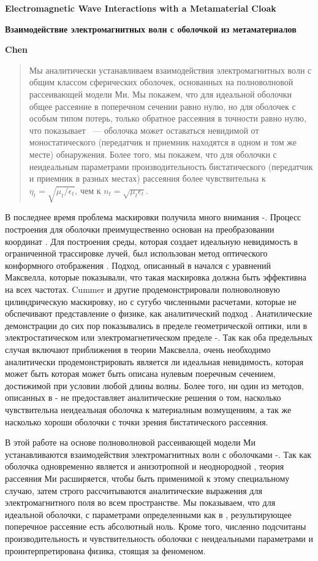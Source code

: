 \documentclass[a4paper, 12pt]{article}
\newcommand{\tit}[1]{\begin{center}{\bf{\Large #1}}\end{center}}
\newcommand{\aut}[1]{\centerline{{\bf #1}}}
\begin{document}
\sloppy
\tit{Electromagnetic Wave Interactions with a Metamaterial Cloak}
\tit{Взаимодействие электромагнитных волн с оболочкой из метаматериалов}
\aut{Chen}

\begin{abstract}
Мы аналитически устанавливаем взаимодействия электромагнитных волн с общим
классом сферических оболочек, основанных на полноволновой рассеивающей модели Ми.
Мы покажем, что для идеальной оболочки общее рассеяние в поперечном сечении равно
нулю, но для оболочек с особым типом потерь, только обратное рассеяния в точности 
равно нулю, что показывает ~--- оболочка может оставаться невидимой от 
моностатического (передатчик и приемник находятся в одном и том же месте) 
обнаружения. Более того, мы покажем, что для оболочки с неидеальным параметрами
производительность бистатического (передатчик и приемник в разных местах) рассеяния
более чувствительна к $\eta_t=\sqrt{\mu_t/\epsilon_t}$, чем
к $n_t=\sqrt{\mu_t\epsilon_t}$.
\end{abstract}


В последнее время проблема маскировки получила много внимания \cite{1}-\cite{11}.
Процесс построения для оболочки преимущественно основан на преобразовании координат
\cite{4}. Для построения среды, которая создает идеальную невидимость в ограниченной
трассировке лучей, был использован метод оптического конформного отображения 
\cite{6}. Подход, описанный в \cite{4} начался с уравнений Максвелла, которые показывали, что такая маскировка должна быть эффективна на всех частотах. 
Cummer и другие продемонстрировали полноволновую цилиндрическую маскировку, но с 
сугубо численными расчетами, которые не обспечивают представление о физике, как 
аналитический подход \cite{2}. Анатилические демонстрации до сих пор 
показывались в пределе геометрической оптики, или в электростатическом или 
электромагнетическом пределе \cite{4}-\cite{6}. 
Так как оба предельных случая включают
приближения в теории Максвелла, очень необходимо аналитически продемонстрировать
является ли идеальная невидимость, которая может быть которая может быть описана
нулевым поеречным сечением, достижимой при условии любой длины волны.  Более того,
ни один из методов, описанных в \cite{4}-\cite{6} 
не предоставляет аналитические решения
о том, насколько чувствительна неидеальная оболочка к материалным возмущениям,
а так же насколько хороши оболочки с точки зрения бистатического рассеяния.

В этой работе на основе полноволновой рассеивающей модели Ми устанавливаются 
взаимодействия электромагнитных волн с оболочками \cite{12}-\cite{14}. 
Так как оболочка
одновременно является и анизотропной и неоднородной \cite{4}, теория рассеяния
Ми расширяется, чтобы быть применимой к этому специальному случаю, затем строго
рассчитываются аналитические выражения для электромагнитного поля во всем 
пространстве. Мы показываем, что для идеальной оболочки, с параметрами определенными
как в \cite{4}, результирующее поперечное рассеяние есть абсолютный ноль. Кроме 
того, численно подсчитаны производительность и чувствительность оболочки с 
неидеальными параметрами и проинтерпретирована физика, стоящая за феноменом.
\end{document}
